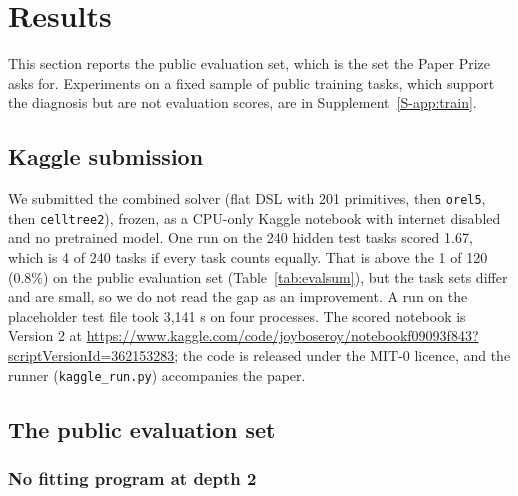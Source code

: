 \documentclass[sigconf,nonacm]{acmart}
\begin{document}
\section{Results}

This section reports the public evaluation set, which is the set the Paper Prize asks for. Experiments on a fixed sample of public training tasks, which support the diagnosis but are not evaluation scores, are in Supplement~\ref{S-app:train}.

\subsection{Kaggle submission}\label{sec:kaggle}

We submitted the combined solver (flat DSL with 201 primitives, then \texttt{orel5}, then \texttt{celltree2}), frozen, as a CPU-only Kaggle notebook with internet disabled and no pretrained model. One run on the 240 hidden test tasks scored 1.67, which is 4 of 240 tasks if every task counts equally. That is above the 1 of 120 (0.8\%) on the public evaluation set (Table~\ref{tab:evalsum}), but the task sets differ and are small, so we do not read the gap as an improvement. A run on the placeholder test file took 3{,}141 s on four processes. The scored notebook is Version 2 at \url{https://www.kaggle.com/code/joyboseroy/notebookf09093f843?scriptVersionId=362153283}; the code is released under the MIT-0 licence, and the runner (\texttt{kaggle\_run.py}) accompanies the paper.

\subsection{The public evaluation set}

\subsubsection{No fitting program at depth 2}\label{sec:eval}
\end{document}
